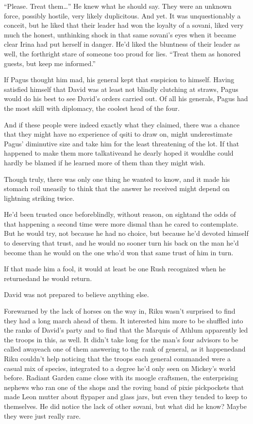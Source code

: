 ``Please. Treat them\ldots'' He knew what he should say. They were an unknown force, possibly hostile, very likely duplicitous. And yet. It was unquestionably a conceit, but he liked that their leader had won the loyalty of a sovani, liked very much the honest, unthinking shock in that same sovani's eyes when it became clear Irina had put herself in danger. He'd liked the bluntness of their leader as well, the forthright stare of someone too proud for lies. ``Treat them as honored guests, but keep me informed.''

If Pagus thought him mad, his general kept that suspicion to himself. Having satisfied himself that David was at least not blindly clutching at straws, Pagus would do his best to see David's orders carried out. Of all his generals, Pagus had the most skill with diplomacy, the coolest head of the four.

And if these people were indeed exactly what they claimed, there was a chance that they might have no experience of qsiti to draw on, might underestimate Pagus' diminutive size and take him for the least threatening of the lot. If that happened to make them more talkative\textemdash and he dearly hoped it would\textemdash he could hardly be blamed if he learned more of them than they might wish.

Though truly, there was only one thing he wanted to know, and it made his stomach roil uneasily to think that the answer he received might depend on lightning striking twice.

He'd been trusted once before\textemdash blindly, without reason, on sight\textemdash and the odds of that happening a second time were more dismal than he cared to contemplate. But he would try, not because he had no choice, but because he'd devoted himself to deserving that trust, and he would no sooner turn his back on the man he'd become than he would on the one who'd won that same trust of him in turn.

If that made him a fool, it would at least be one Rush recognized when he returned\textemdash and he would return.

David was not prepared to believe anything else.


\scenechange


Forewarned by the lack of horses on the way in, Riku wasn't surprised to find they had a long march ahead of them. It interested him more to be shuffled into the ranks of David's party and to find that the Marquis of Athlum apparently led the troops in this, as well. It didn't take long for the man's four advisors to be called away\textemdash each one of them answering to the rank of general, as it happened\textemdash and Riku couldn't help noticing that the troops each general commanded were a casual mix of species, integrated to a degree he'd only seen on Mickey's world before. Radiant Garden came close with its moogle craftsmen, the enterprising nephews who ran one of the shops and the roving band of pixie pickpockets that made Leon mutter about flypaper and glass jars, but even they tended to keep to themselves. He did notice the lack of other sovani, but what did he know? Maybe they were just really rare.

